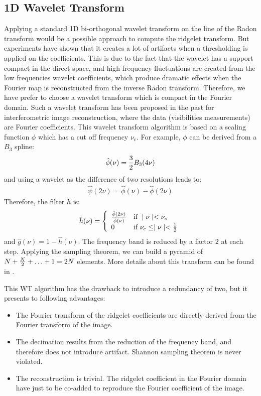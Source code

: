 \documentclass[11pt,a4paper]{article}
\begin{document}
\subsection{1D Wavelet Transform}
Applying a standard 1D bi-orthogonal wavelet transform on the 
line of the Radon transform would be a possible approach to compute the
ridgelet transform. But experiments have shown that it creates
a lot of artifacts when a thresholding is applied on the coefficients.
This is due to the fact that the wavelet has a support compact in the direct 
space, and high frequency fluctuations are created from the low frequencies
wavelet coefficients, which produce dramatic effects when the Fourier 
map is reconstructed from the inverse Radon transform. Therefore, 
we have prefer to choose a wavelet transform which is compact in the
Fourier domain. Such a wavelet transform has been proposed in the past 
\cite{starck:sta94_3,starck:book98} for interferometric image reconstruction,
where the data (visibilities measurements) are Fourier coefficients.
This wavelet transform algorithm is based on a scaling function $\phi$ which
has a cut off frequency $\nu_c$. 
For example, $\phi$ can be derived from a $B_3$ spline:
\begin{eqnarray}
\hat{\phi}(\nu)={3\over 2}B_3(4\nu)
\end{eqnarray}
and using a wavelet as the difference of two resolutions leads to:
\begin{eqnarray}
\hat \psi(2\nu) = \hat \phi(\nu) - \hat \phi(2\nu)
\end{eqnarray}
Therefore, the filter $h$ is:
\begin{eqnarray}
\hat h(\nu)= \left\{
  \begin{array}{ll}
  {\hat{\phi}(2\nu)\over \hat{\phi}(\nu)} & \mbox{if } \mid \nu \mid < \nu_c \\
0 & \mbox{if } \nu_c  \leq \mid \nu \mid < {1\over 2} 
  \end{array}
  \right.
\end{eqnarray}
and $\hat g(\nu) = 1 - \hat h(\nu)$.
The frequency band is reduced by a factor $2$ at each step.
Applying the sampling theorem, we can build a pyramid  of
$N+{N\over 2}+\ldots+1=2N$ elements. More details about this transform can 
be found in \cite{starck:book98}.

This WT algorithm has the drawback to introduce a redundancy of two,
but it presents to following advantages:
\begin{itemize}
\item The Fourier transform of the ridgelet coefficients are directly
derived from the Fourier transform of the image.
\item The decimation results from the reduction of the frequency band,
and therefore does not introduce artifact. Shannon sampling theorem is
never violated.
\item The reconstruction is trivial. The ridgelet coefficient in the Fourier
domain have just to be co-added to reproduce the Fourier coefficient of the image.
\end{itemize}
 
\end{document}
